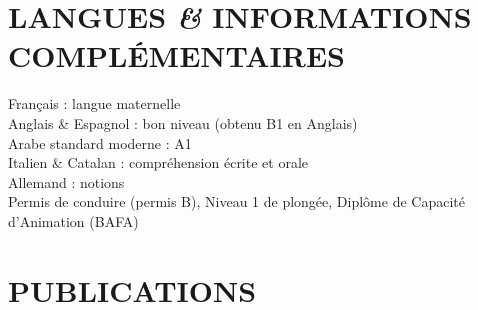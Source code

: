 \documentclass{article}
\begin{document}
\section*{LANGUES \textit{\&} INFORMATIONS COMPLÉMENTAIRES}

Français : langue maternelle \\
Anglais \& Espagnol : bon niveau (obtenu B1 en Anglais) \\
Arabe standard moderne : A1 \\
Italien \& Catalan : compréhension écrite et orale \\
Allemand : notions \\

Permis de conduire (permis B), Niveau 1 de plongée, Diplôme de Capacité d'Animation (BAFA)


\section{PUBLICATIONS}
\end{document}
